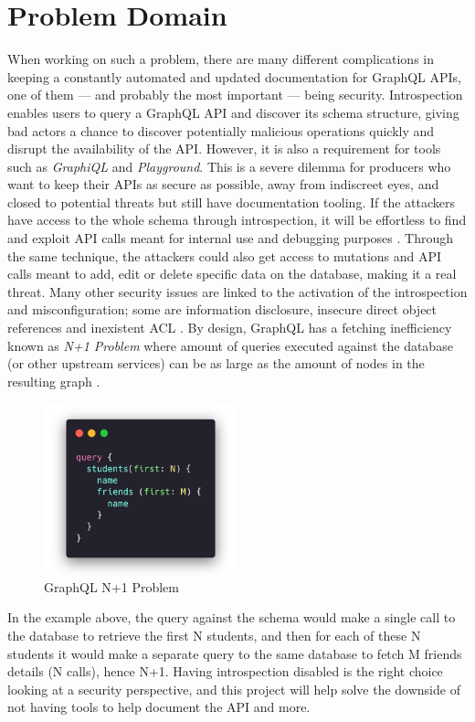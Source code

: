 \section*{Problem Domain}
\label{s:Problem-Domain}
When working on such a problem, there are many different complications in
keeping a constantly automated and updated documentation for GraphQL APIs, one
of them --- and probably the most important --- being security. Introspection
enables users to query a GraphQL API and discover its schema structure, giving
bad actors a chance to discover potentially malicious operations
\citep{khalilWhyYouShould2021} quickly and disrupt the availability of the API.
However, it is also a requirement for tools such as \textit{GraphiQL} and
\textit{Playground}. This is a severe dilemma for producers who want to keep
their APIs as secure as possible, away from indiscreet eyes, and closed to
potential threats but still have documentation tooling. If the attackers have
access to the whole schema through introspection, it will be effortless to find
and exploit API calls meant for internal use and debugging purposes
\citep{rizwanGraphQLCommonVulnerabilities2021}. Through the same technique, the
attackers could also get access to mutations and API calls meant to add, edit or
delete specific data on the database, making it a real threat. Many other
security issues are linked to the activation of the introspection and
misconfiguration; some are information disclosure, insecure direct object
references and inexistent ACL \citep{ yeswehackHowExploitGraphQL2021}. By design,
GraphQL has a fetching inefficiency known as \textit{N+1 Problem} where amount
of queries executed against the database (or other upstream services) can be as
large as the amount of nodes in the resulting graph \citep{
graphqlbypopSuppressingProblemGraphQL2020}.
\begin{figure}[H]
  \centering
  \includegraphics[width=0.5\textwidth]{figures/code/n+1}
  \caption{GraphQL N+1 Problem}
  \label{f:GraphQL-N1-Problem}
\end{figure}
In the example above, the query against the schema would make a single call to
the database to retrieve the first N students, and then for each of these N
students it would make a separate query to the same database to fetch M friends
details (N calls), hence N+1. Having introspection disabled is the right choice
looking at a security perspective, and this project will help solve the downside
of not having tools to help document the API and more.

